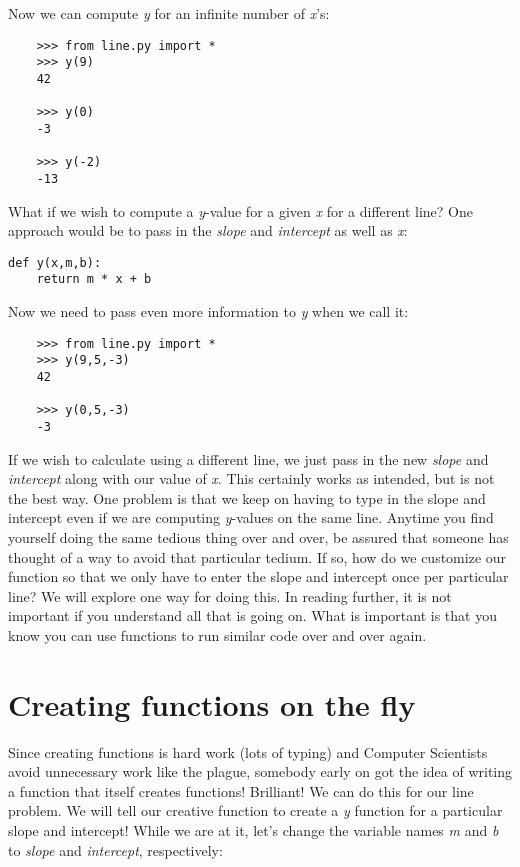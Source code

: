 Now we can compute {\it y} for an infinite number of {\it x}'s:

\begin{verbatim}
    >>> from line.py import *
    >>> y(9)
    42
    
    >>> y(0)
    -3
    
    >>> y(-2)
    -13
\end{verbatim}

What if we wish to
compute a {\it y}-value for a given {\it x} for a different
line? One approach would be to pass in the {\it slope} and {\it intercept}
as well as {\it x}:

\begin{verbatim}
def y(x,m,b):
    return m * x + b
\end{verbatim}

Now we need to pass even more information to {\it y} when we call it:
    
\begin{verbatim}
    >>> from line.py import *
    >>> y(9,5,-3)
    42
     
    >>> y(0,5,-3)
    -3
\end{verbatim}

If we wish to calculate using a different line, we just pass in the
new {\it slope} and {\it intercept} along with our value of {\it x}.
This certainly works as intended, but is not the best way. One problem
is that we keep on having to type in the slope and intercept even if
we are computing {\it y}-values on the same line. Anytime you
find yourself doing the same tedious thing over and over,
be assured that
someone has thought of a way to avoid that particular tedium.
If so, how do we
customize our function so that we only have to enter the slope
and intercept once per particular line? We will explore
one way for doing this. In reading further,
it is not important if you understand all that is going on.
What is important is that you know you can use functions
to run similar code over and over again.

\section{Creating functions on the fly}

Since creating functions is hard work (lots of typing) and
Computer Scientists avoid unnecessary work like the plague, somebody
early on got the idea of writing a function that itself 
creates functions! Brilliant! We can do this for our line problem.
We will tell our creative function to create a {\it y} function
for a particular slope and intercept! While we are at it,
let's change the variable names {\it m} and {\it b} to {\it slope}
and {\it intercept}, respectively:

